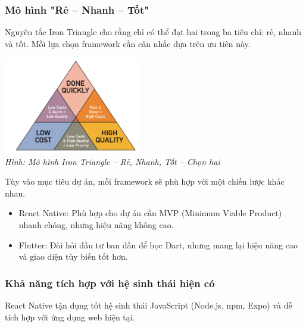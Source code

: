 \begin{flushleft}
    \subsubsection{Mô hình "Rẻ – Nhanh – Tốt"}
    \begin{flushleft}
      \hspace*{0.8cm}Nguyên tắc Iron Triangle cho rằng chỉ có thể đạt hai trong ba tiêu chí: rẻ, nhanh và tốt. Mỗi lựa chọn framework cần cân nhắc dựa trên ưu tiên này.
    \end{flushleft}
    
    \begin{flushleft}
      \centering
      \includegraphics[width=0.45\textwidth]{images/iron_triangle.png} \\
      \textit{\small Hình: Mô hình Iron Triangle – Rẻ, Nhanh, Tốt – Chọn hai}
    \end{flushleft}
    
    \begin{flushleft}
      \hspace*{0.8cm}Tùy vào mục tiêu dự án, mỗi framework sẽ phù hợp với một chiến lược khác nhau.
      \setlength{\leftmargini}{1.5cm}
      \begin{itemize}
          \item React Native: Phù hợp cho dự án cần MVP (Minimum Viable Product) nhanh chóng, nhưng hiệu năng không cao.
          \item Flutter: Đòi hỏi đầu tư ban đầu để học Dart, nhưng mang lại hiệu năng cao và giao diện tùy biến tốt hơn.
      \end{itemize}
    \end{flushleft}
    

  \subsubsection{Khả năng tích hợp với hệ sinh thái hiện có}
    \begin{flushleft}
      \hspace*{0.8cm}React Native tận dụng tốt hệ sinh thái JavaScript (Node.js, npm, Expo) và dễ tích hợp với ứng dụng web hiện tại.
    \end{flushleft}


\end{flushleft}
